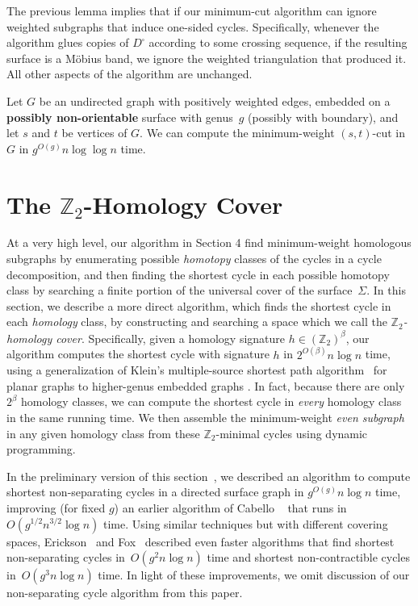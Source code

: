 \documentclass[letterpaper,review]{siamart190516}
\def\Z{\mathbb{Z}}
\begin{document}
The previous lemma implies that if our minimum-cut algorithm can ignore weighted subgraphs that induce one-sided cycles.  Specifically, whenever the algorithm glues copies of $D^\square$ according to some crossing sequence, if the resulting surface is a Möbius band, we ignore the weighted triangulation that produced it.  All other aspects of the algorithm are unchanged.

\begin{corollary}
Let $G$ be an undirected graph with positively weighted edges, embedded on a \textbf{possibly non-orientable} surface with genus~$g$ (possibly with boundary), and let $s$ and $t$ be vertices of $G$.  We can compute the minimum-weight $(s,t)$-cut in $G$ in $g^{O(g)} n\log \log n$ time.
\end{corollary}

\section{The $\Z_2$-Homology Cover}
\label{sec:homcover}

At a very high level, our algorithm in Section 4 find minimum-weight homologous subgraphs by enumerating possible \emph{homotopy} classes of the cycles in a cycle decomposition, and then finding the shortest cycle in each possible homotopy class by searching a finite portion of the universal cover of the surface~$\Sigma$.  In this section, we describe a more direct algorithm, which finds the shortest cycle in each \emph{homology} class, by constructing and searching a space which we call the \emph{$\Z_2$-homology cover}.
Specifically, given a homology signature $h\in (\Z_2)^\beta$, our algorithm computes the shortest
cycle with signature $h$ in $2^{O(\beta)} n \log n$ time, using a generalization of Klein's
multiple-source shortest path algorithm~\cite{k-msspp-05} for planar graphs to higher-genus embedded
graphs \cite{cce-msspe-13,efl-hmcpf-18}.
In fact, because there are only $2^\beta$ homology classes, we can compute the shortest cycle in \emph{every} homology class in the same running time.
We then assemble the minimum-weight \emph{even subgraph} in any given homology class from these $\Z_2$-minimal cycles using dynamic programming.

In the preliminary version of this section~\cite{en-mcsnc-11}, we described an algorithm to compute shortest non-separating cycles in a directed surface graph in $g^{O(g)} n \log n$ time, improving
(for fixed $g$) an earlier algorithm of Cabello \etal~\cite{ccl-fsncd-10} that runs in
$O(g^{1/2}n^{3/2}\log n)$ time.  Using similar techniques but with different covering spaces,
Erickson~\cite{e-sncds-11} and Fox~\cite{f-sntcd-13} described even faster algorithms that find
shortest non-separating cycles in~$O(g^2 n \log n)$ time and shortest non-contractible cycles
in~$O(g^3 n \log n)$ time.  In light of these improvements, we omit discussion of our non-separating
cycle algorithm from this paper.
\end{document}
